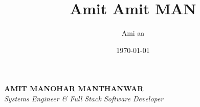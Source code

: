 
%
\title{Amit \LARGE{Amit} MAN}
\author{Ami aa}
\date{\dateFormat\today}

\thispagestyle{fancyTitle}
\pagestyle{fancy} %
\vspace*{-14mm}
\begin{center}
\textbf{\LARGE{A}\Large{MIT} \LARGE{M}\Large{ANOHAR} \LARGE{M}\Large{ANTHANWAR}}\\[2mm]
\emph{Systems Engineer \& Full Stack Software Developer}
\end{center}

